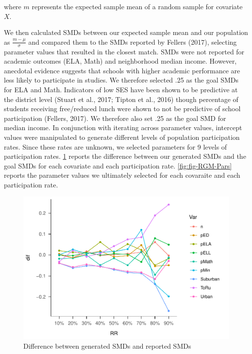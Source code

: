 \documentclass[man,floatsintext]{apa6}
\theoremstyle{definition}
\theoremstyle{definition}
\theoremstyle{definition}
\theoremstyle{remark}
\begin{document}
where \(m\) represents the expected sample mean of a random sample for
covariate \(X\).

We then calculated SMDs between our expected sample mean and our
population as \(\frac{m - \mu}{\sigma}\) and compared them to the SMDs
reported by Fellers (2017), selecting parameter values that resulted in
the closest match. SMDs were not reported for academic outcomes (ELA,
Math) and neighborhood median income. However, anecdotal evidence
suggests that schools with higher academic performance are less likely
to participate in studies. We therefore selected .25 as the goal SMDs
for ELA and Math. Indicators of low SES have been shown to be predictive
at the district level (Stuart et al., 2017; Tipton et al., 2016) though
percentage of students receiving free/reduced lunch were shown to not be
predictive of school participation (Fellers, 2017). We therefore also
set .25 as the goal SMD for median income. In conjunction with iterating
across parameter values, intercept values were manipulated to generate
different levels of population participation rates. Since these rates
are unknown, we selected parameters for 9 levels of participation rates.
\ref{fig:fig-SMD-goal} reports the difference between our generated SMDs
and the goal SMDs for each covariate and each participation rate.
\ref{fig:fig-RGM-Pars} reports the parameter values we ultimately
selected for each covaraite and each participation rate.

\begin{figure}
\centering
\includegraphics{GenSamp_Paper_files/figure-latex/fig-SMD-goal-1.pdf}
\caption{\label{fig:fig-SMD-goal}Difference between generated SMDs and
reported SMDs}
\end{figure}
\end{document}
